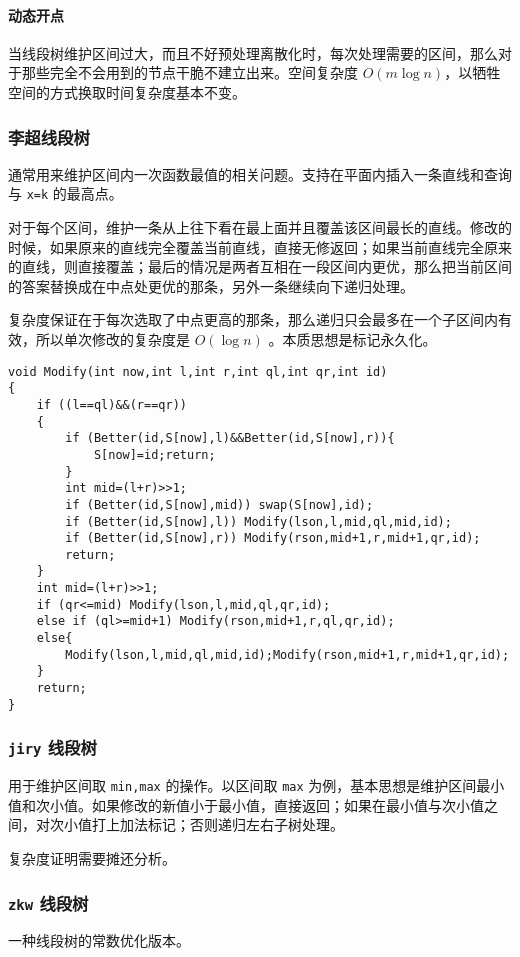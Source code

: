 \documentclass[UTF-8]{ctexart}
\begin{document}
	\paragraph{动态开点} 当线段树维护区间过大，而且不好预处理离散化时，每次处理需要的区间，那么对于那些完全不会用到的节点干脆不建立出来。空间复杂度 $O(m \log n)$，以牺牲空间的方式换取时间复杂度基本不变。
	
	\subsubsection{李超线段树}
	通常用来维护区间内一次函数最值的相关问题。支持在平面内插入一条直线和查询与 \texttt{x=k} 的最高点。
	
	对于每个区间，维护一条从上往下看在最上面并且覆盖该区间最长的直线。修改的时候，如果原来的直线完全覆盖当前直线，直接无修返回；如果当前直线完全原来的直线，则直接覆盖；最后的情况是两者互相在一段区间内更优，那么把当前区间的答案替换成在中点处更优的那条，另外一条继续向下递归处理。
	
	复杂度保证在于每次选取了中点更高的那条，那么递归只会最多在一个子区间内有效，所以单次修改的复杂度是 $O(\log n)$ 。本质思想是标记永久化。
\begin{verbatim}
void Modify(int now,int l,int r,int ql,int qr,int id)
{
    if ((l==ql)&&(r==qr))
    {
        if (Better(id,S[now],l)&&Better(id,S[now],r)){
            S[now]=id;return;
        }
        int mid=(l+r)>>1;
        if (Better(id,S[now],mid)) swap(S[now],id);
        if (Better(id,S[now],l)) Modify(lson,l,mid,ql,mid,id);
        if (Better(id,S[now],r)) Modify(rson,mid+1,r,mid+1,qr,id);
        return;
    }
    int mid=(l+r)>>1;
    if (qr<=mid) Modify(lson,l,mid,ql,qr,id);
    else if (ql>=mid+1) Modify(rson,mid+1,r,ql,qr,id);
    else{
        Modify(lson,l,mid,ql,mid,id);Modify(rson,mid+1,r,mid+1,qr,id);
    }
    return;
}
\end{verbatim}
	\subsubsection{\texttt{jiry} 线段树}
	用于维护区间取 \texttt{min,max} 的操作。以区间取 \texttt{max} 为例，基本思想是维护区间最小值和次小值。如果修改的新值小于最小值，直接返回；如果在最小值与次小值之间，对次小值打上加法标记；否则递归左右子树处理。
	
	复杂度证明需要摊还分析。
	
\subsubsection{\texttt{zkw} 线段树}
	一种线段树的常数优化版本。
	
\end{document}
